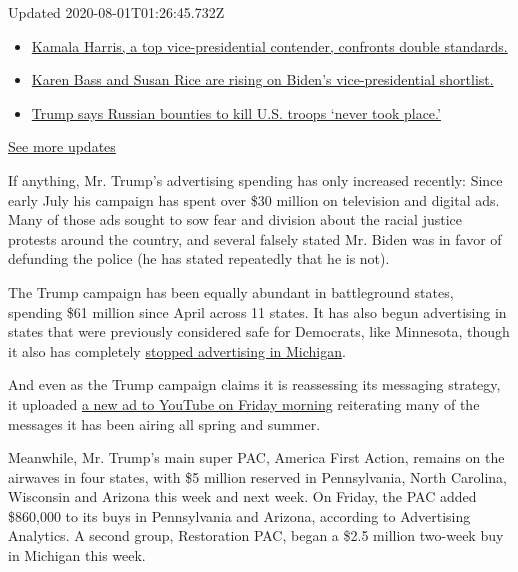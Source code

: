 Updated 2020-08-01T01:26:45.732Z

\begin{itemize}
\tightlist
\item
  \href{https://www.nytimes.com/2020/07/31/us/elections/biden-vs-trump.html?action=click\&pgtype=Article\&state=default\&region=MAIN_CONTENT_1\&context=storylines_live_updates\#link-29fdff45}{Kamala
  Harris, a top vice-presidential contender, confronts double
  standards.}
\item
  \href{https://www.nytimes.com/2020/07/31/us/elections/biden-vs-trump.html?action=click\&pgtype=Article\&state=default\&region=MAIN_CONTENT_1\&context=storylines_live_updates\#link-13ec3d9c}{Karen
  Bass and Susan Rice are rising on Biden's vice-presidential
  shortlist.}
\item
  \href{https://www.nytimes.com/2020/07/31/us/elections/biden-vs-trump.html?action=click\&pgtype=Article\&state=default\&region=MAIN_CONTENT_1\&context=storylines_live_updates\#link-49e9a016}{Trump
  says Russian bounties to kill U.S. troops `never took place.'}
\end{itemize}

\href{https://www.nytimes.com/2020/07/31/us/elections/biden-vs-trump.html?action=click\&pgtype=Article\&state=default\&region=MAIN_CONTENT_1\&context=storylines_live_updates}{See
more updates}

If anything, Mr. Trump's advertising spending has only increased
recently: Since early July his campaign has spent over \$30 million on
television and digital ads. Many of those ads sought to sow fear and
division about the racial justice protests around the country, and
several falsely stated Mr. Biden was in favor of defunding the police
(he has stated repeatedly that he is not).

The Trump campaign has been equally abundant in battleground states,
spending \$61 million since April across 11 states. It has also begun
advertising in states that were previously considered safe for
Democrats, like Minnesota, though it also has completely
\href{https://www.nytimes.com/2020/07/29/us/politics/michigan-trump-biden-2020.html}{stopped
advertising in Michigan}.

And even as the Trump campaign claims it is reassessing its messaging
strategy, it uploaded
\href{https://www.youtube.com/watch?v=_rEO2a4BfwQ}{a new ad to YouTube
on Friday morning} reiterating many of the messages it has been airing
all spring and summer.

Meanwhile, Mr. Trump's main super PAC, America First Action, remains on
the airwaves in four states, with \$5 million reserved in Pennsylvania,
North Carolina, Wisconsin and Arizona this week and next week. On
Friday, the PAC added \$860,000 to its buys in Pennsylvania and Arizona,
according to Advertising Analytics. A second group, Restoration PAC,
began a \$2.5 million two-week buy in Michigan this week.

